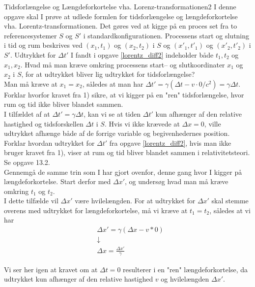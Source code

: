 \documentclass[crop=false, class=memoir]{standalone}
\begin{document}
\begin{opgave}{Tidsforlængelse og Længdeforkortelse vha. Lorenz-transformationen}{2}
	I denne opgave skal I prøve at udlede formlen for tidsforlængelse og længdeforkortelse vha. Lorentz-transformationen. Det gøres ved at kigge på en proces set fra to referencesystemer $S$ og $S'$ i standardkonfigurationen. Processens start og slutning i tid og rum beskrives ved $(x_1,t_1)$ og $(x_2,t_2)$ i $S$ og $(x'_1,t'_1)$ og $(x'_2,t'_2)$ i $S'$.
	\opg Udtrykket for $\Delta t'$ I fandt i opgave \ref{lorentz_diff2} indeholder både $t_1,t_2$ og $x_1,x_2$. Hvad må man kræve omkring processens start-- og slutkoordinater $x_1$ og $x_2$ i $S$, for at udtrykket bliver lig udtrykket for tidsforlængelse?\\
	
	Man må kræve at $x_1=x_2$, således at man har $\Delta t'=\gamma(\Delta t-v \cdot 0/c^2)=\gamma\Delta t$.\\
	\opg Forklar hvorfor kravet fra 1) sikre, at vi kigger på en "ren" tidsforlængelse, hvor rum og tid ikke bliver blandet sammen.\\
	
	I tilfældet af at $\Delta t' =\gamma\Delta t$, kan vi se at tiden $\Delta t'$ kun afhænger af den relative hastighed og tidsforskellen $\Delta t$ i $S$. Hvis vi ikke krævede at $\Delta x=0$, ville udtrykket afhænge både af de forrige variable og begivenhedernes position.\\
	\opg Forklar hvordan udtrykket for $\Delta t'$ fra opgave \ref{lorentz_diff2}, hvis man ikke bruger kravet fra 1), viser at rum og tid bliver blandet sammen i relativitetsteori.\\
	
	Se opgave 13.2.\\
	\opg Gennemgå de samme trin som I har gjort ovenfor, denne gang hvor I kigger på længdeforkortelse. Start derfor med $\Delta x'$, og undersøg hvad man må kræve omkring $t_1$ og $t_2$.\\
	
	I dette tilfælde vil $\Delta x'$ være hvilelængden. For at udtrykket for $\Delta x'$ skal stemme overens med udtrykket for længdeforkortelse, må vi kræve at $t_1=t_2$, således at vi har
	\begin{align*}
	&\Delta x'=\gamma(\Delta x-v*0) \\
	&\downarrow \\
	&\Delta x=\frac{\Delta x'}{\gamma}
	\end{align*}
	
	Vi ser her igen at kravet om at $\Delta t = 0$ resulterer i en "ren" længdeforkortelse, da udtrykket kun afhænger af den relative hastighed $v$ og hvilelængden $\Delta x'$.
\end{opgave}
\end{document}
